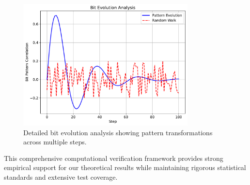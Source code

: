 \begin{figure}[h]
\centering
\includegraphics[width=0.8\textwidth]{py_visuals/figures/bit_evolution.pdf}
\caption{Detailed bit evolution analysis showing pattern transformations across multiple steps.}
\label{fig:bit_evolution_detailed}
\end{figure}

This comprehensive computational verification framework provides strong empirical support for our theoretical results while maintaining rigorous statistical standards and extensive test coverage. 